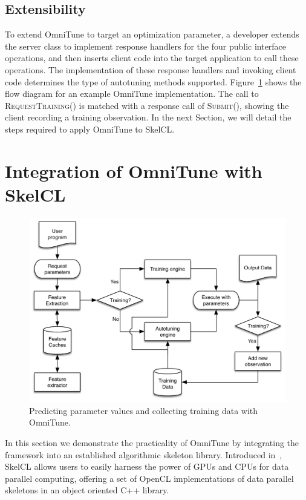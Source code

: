\documentclass[nonatbib,preprint,nocopyrightspace,9pt]{sigplanconf}
\begin{document}
\subsection{Extensibility}

To extend OmniTune to target an optimization parameter, a developer
extends the server class to implement response handlers for the four
public interface operations, and then inserts client code into the
target application to call these operations. The implementation of
these response handlers and invoking client code determines the type
of autotuning methods supported. Figure~\ref{fig:omnitune-system-flow}
shows the flow diagram for an example OmniTune implementation. The
call to \textsc{RequestTraining()} is matched with a response call of
\textsc{Submit()}, showing the client recording a training
observation. In the next Section, we will detail the steps required to
apply OmniTune to SkelCL.


\section{Integration of OmniTune with SkelCL}\label{sec:omnitune-skelcl}

\begin{figure}
\centering
\includegraphics[width=\columnwidth]{img/omnitune-system-flow.pdf}
\caption[Optimization parameter selection with OmniTune]{%
  Predicting parameter values and collecting training data with
  OmniTune.%
}
\label{fig:omnitune-system-flow}
\end{figure}

In this section we demonstrate the practicality of OmniTune by
integrating the framework into an established algorithmic skeleton
library. Introduced in~\cite{Steuwer2011}, SkelCL allows users to
easily harness the power of GPUs and CPUs for data parallel computing,
offering a set of OpenCL implementations of data parallel skeletons in
an object oriented C++ library.
\end{document}
